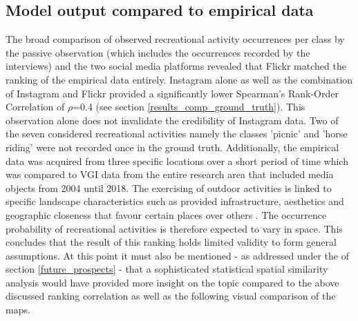 \subsection{Model output compared to empirical data}
The broad comparison of observed recreational activity occurrences per class by the passive observation (which includes the occurrences recorded by the interviews) and the two social media platforms revealed that Flickr matched the ranking of the empirical data entirely. Instagram alone as well as the combination of Instagram and Flickr provided a significantly lower Spearman's Rank-Order Correlation of $\rho$=0.4 (see section \ref{results_comp_ground_truth}). This observation alone does not invalidate the credibility of Instagram data. Two of the seven considered recreational activities namely the classes 'picnic' and 'horse riding' were not recorded once in the ground truth. Additionally, the empirical data was acquired from three specific locations over a short period of time which was compared to VGI data from the entire research area that included media objects from 2004 until 2018. The exercising of outdoor activities is linked to specific landscape characteristics such as provided infrastructure, aesthetics and geographic closeness that favour certain places over others \parencite{Mancini2018a}. The occurrence probability of recreational activities is therefore expected to vary in space. This concludes that the result of this ranking holds limited validity to form general assumptions. At this point it must also be mentioned - as addressed under the  of section \ref{future_prospects} - that a sophisticated statistical spatial similarity analysis would have provided more insight on the topic compared to the above discussed ranking correlation as well as the following visual comparison of the maps. \\

